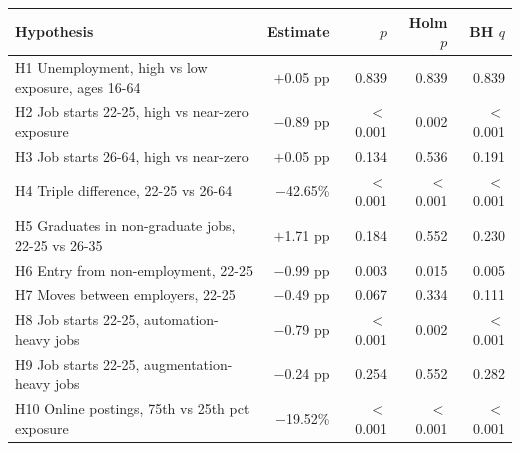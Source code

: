 \begin{tabular}{lrrrr}
\toprule
Hypothesis & Estimate & $p$ & Holm $p$ & BH $q$ \\
\midrule
H1 Unemployment, high vs low exposure, ages 16-64 & \ensuremath{+}0.05 pp & 0.839 & 0.839 & 0.839 \\
H2 Job starts 22-25, high vs near-zero exposure & \ensuremath{-}0.89 pp & $<$0.001 & 0.002 & $<$0.001 \\
H3 Job starts 26-64, high vs near-zero & \ensuremath{+}0.05 pp & 0.134 & 0.536 & 0.191 \\
H4 Triple difference, 22-25 vs 26-64 & \ensuremath{-}42.65\% & $<$0.001 & $<$0.001 & $<$0.001 \\
H5 Graduates in non-graduate jobs, 22-25 vs 26-35 & \ensuremath{+}1.71 pp & 0.184 & 0.552 & 0.230 \\
H6 Entry from non-employment, 22-25 & \ensuremath{-}0.99 pp & 0.003 & 0.015 & 0.005 \\
H7 Moves between employers, 22-25 & \ensuremath{-}0.49 pp & 0.067 & 0.334 & 0.111 \\
H8 Job starts 22-25, automation-heavy jobs & \ensuremath{-}0.79 pp & $<$0.001 & 0.002 & $<$0.001 \\
H9 Job starts 22-25, augmentation-heavy jobs & \ensuremath{-}0.24 pp & 0.254 & 0.552 & 0.282 \\
H10 Online postings, 75th vs 25th pct exposure & \ensuremath{-}19.52\% & $<$0.001 & $<$0.001 & $<$0.001 \\
\bottomrule
\end{tabular}
